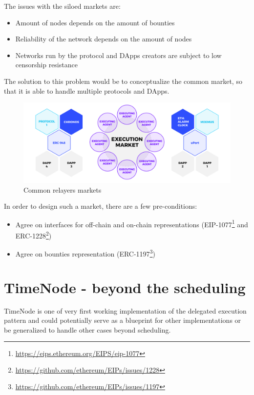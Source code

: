 \documentclass{report}
\begin{document}
  The issues with the siloed markets are:
  \begin{itemize}
    \item Amount of nodes depends on the amount of bounties
    \item Reliability of the network depends on the amount of nodes
    \item Networks run by the protocol and DApps creators are subject to low censorship resistance
  \end{itemize}

  The solution to this problem would be to conceptualize the common market, so that it is able to handle multiple protocols and DApps.

  \begin{figure}[h]
    \includegraphics[width=\textwidth]{comon}
    \caption{Common relayers markets}
  \end{figure}

  In order to design such a market, there are a few pre-conditions:

  \begin{itemize}
    \item Agree on interfaces for off-chain and on-chain representations (EIP-1077\footnote{\url{https://eips.ethereum.org/EIPS/eip-1077}} and ERC-1228\footnote{\url{https://github.com/ethereum/EIPs/issues/1228}})
    \item Agree on bounties representation (ERC-1197\footnote{\url{https://github.com/ethereum/EIPs/issues/1197}})
  \end{itemize}

  \section{TimeNode - beyond the scheduling}

  TimeNode is one of very first working implementation of the delegated execution pattern and could potentially serve as a blueprint for other implementations or be generalized to handle other cases beyond scheduling. 
\end{document}
